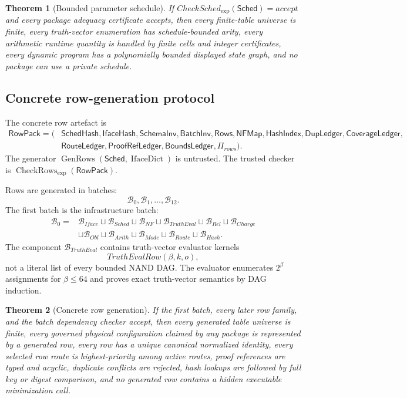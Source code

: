 \documentclass[10.5pt,a4paper]{article}
\newtheorem{theorem}{Theorem}[section]
\newcommand{\IfaceDict}{\operatorname{IfaceDict}}
\newcommand{\IfaceHash}{\mathsf{IfaceHash}}
\newcommand{\CheckRows}{\operatorname{CheckRows}_{\exp}}
\begin{document}
\begin{theorem}[Bounded parameter schedule]
If \(CheckSched_{\exp}(\mathsf{Sched})=accept\) and every package adequacy certificate accepts, then every finite-table universe is finite, every truth-vector enumeration has schedule-bounded arity, every arithmetic runtime quantity is handled by finite cells and integer certificates, every dynamic program has a polynomially bounded displayed state graph, and no package can use a private schedule.
\end{theorem}

\subsection{Concrete row-generation protocol}
The concrete row artefact is
\[
\begin{aligned}
\mathsf{RowPack}=(&\mathsf{SchedHash},\IfaceHash,\mathsf{SchemaInv},\mathsf{BatchInv},\mathsf{Rows},\mathsf{NFMap},\mathsf{HashIndex},\mathsf{DupLedger},\mathsf{CoverageLedger},\\
&\mathsf{RouteLedger},\mathsf{ProofRefLedger},\mathsf{BoundsLedger},\Pi_{rows}).
\end{aligned}
\]
The generator \(\operatorname{GenRows}(\mathsf{Sched},\IfaceDict)\) is untrusted.  The trusted checker is \(\CheckRows(\mathsf{RowPack})\).

Rows are generated in batches:
\[
\mathcal B_0,
\mathcal B_1,
\ldots,
\mathcal B_{12}.
\]
The first batch is the infrastructure batch:
\[
\begin{aligned}
\mathcal B_0={}&\mathcal B_{Iface}\sqcup\mathcal B_{Sched}\sqcup\mathcal B_{NF}\sqcup\mathcal B_{TruthEval}\sqcup\mathcal B_{Rel}\sqcup\mathcal B_{Charge}\\
&\sqcup\mathcal B_{Obl}\sqcup\mathcal B_{Arith}\sqcup\mathcal B_{Mode}\sqcup\mathcal B_{Route}\sqcup\mathcal B_{Hash}.
\end{aligned}
\]
The component \(\mathcal B_{TruthEval}\) contains truth-vector evaluator kernels
\[
TruthEvalRow(\beta,k,o),
\]
not a literal list of every bounded NAND DAG.  The evaluator enumerates \(2^\beta\) assignments for \(\beta\le64\) and proves exact truth-vector semantics by DAG induction.

\begin{theorem}[Concrete row generation]
If the first batch, every later row family, and the batch dependency checker accept, then every generated table universe is finite, every governed physical configuration claimed by any package is represented by a generated row, every row has a unique canonical normalized identity, every selected row route is highest-priority among active routes, proof references are typed and acyclic, duplicate conflicts are rejected, hash lookups are followed by full key or digest comparison, and no generated row contains a hidden executable minimization call.
\end{theorem}
\end{document}
